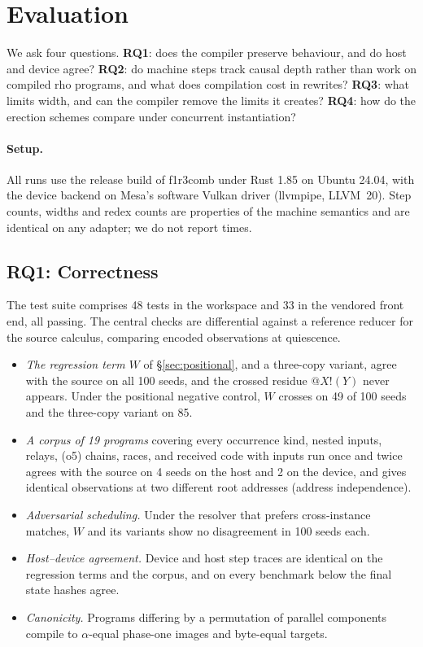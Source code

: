 \documentclass[acmsmall,screen,review,anonymous]{acmart}
\makeatletter
\newcommand{\quo}[1]{@#1}
\newcommand{\out}[2]{#1!(#2)}
\newcommand{\tool}{\textsf{f1r3comb}}
\makeatother
\begin{document}
\section{Evaluation}
\label{sec:eval}

We ask four questions. \textbf{RQ1}: does the compiler preserve behaviour, and
do host and device agree? \textbf{RQ2}: do machine steps track causal depth
rather than work on compiled rho programs, and what does compilation cost in
rewrites? \textbf{RQ3}: what limits width, and can the compiler remove the limits it
creates? \textbf{RQ4}: how do the erection schemes compare under concurrent
instantiation?

\paragraph{Setup.} All runs use the release build of \tool{} under Rust
1.85 on Ubuntu 24.04, with the device backend on Mesa's software Vulkan
driver (llvmpipe, LLVM~20). Step counts, widths and redex counts are
properties of the machine semantics and are identical on any adapter; we do
not report times.

\subsection{RQ1: Correctness}
\label{sec:eval-correct}

The test suite comprises 48 tests in the workspace and 33 in the vendored
front end, all passing. The central checks are differential against a
reference reducer for the source calculus, comparing encoded observations at
quiescence.
\begin{itemize}[leftmargin=1.5em]
\item \emph{The regression term $W$} of \S\ref{sec:positional}, and a
  three-copy variant, agree with the source on all 100 seeds, and the crossed
  residue $\out{\quo{X}}{Y}$ never appears. Under the positional negative
  control, $W$ crosses on 49 of 100 seeds and the three-copy variant on 85.
\item \emph{A corpus of 19 programs} covering every occurrence kind, nested
  inputs, relays, (o5) chains, races, and received code with inputs run once
  and twice agrees with the source on 4 seeds on the host and 2 on the
  device, and gives identical observations at two different root addresses
  (address independence).
\item \emph{Adversarial scheduling.} Under the resolver that prefers
  cross-instance matches, $W$ and its variants show no disagreement in 100
  seeds each.
\item \emph{Host--device agreement.} Device and host step traces are
  identical on the regression terms and the corpus, and on every benchmark
  below the final state hashes agree.
\item \emph{Canonicity.} Programs differing by a permutation of parallel
  components compile to $\alpha$-equal phase-one images and byte-equal
  targets.
\end{itemize}
\end{document}

